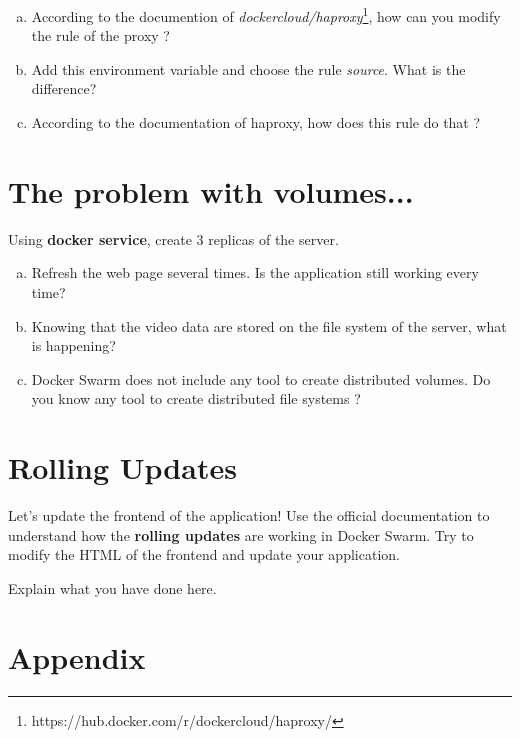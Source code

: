 \documentclass[a4paper,11pt]{exam}
\begin{document}
\begin{questions}
	\question
	\begin{enumerate}[(a)]
		\item According to the documention of \textit{dockercloud/haproxy}\footnote{https://hub.docker.com/r/dockercloud/haproxy/}, how can you modify the rule of the proxy ?
		\item Add this environment variable and choose the rule \textit{source}. What is the difference?
		\item According to the documentation of haproxy, how does this rule do that ?
	\end{enumerate}
\end{questions}


\section{The problem with volumes...}

\begin{questions}
	\question Using \textbf{docker service}, create 3 replicas of the server.
	\begin{enumerate}[(a)]
		\item Refresh the web page several times. Is the application still working every time?
		\item Knowing that the video data are stored on the file system of the server, what is happening?
		\item Docker Swarm does not include any tool to create distributed volumes. Do you know any tool to create distributed file systems ?
	\end{enumerate}
\end{questions}

\section{Rolling Updates}

Let's update the frontend of the application! Use the official documentation to understand how the \textbf{rolling updates} are working in Docker Swarm. Try to modify the HTML of the frontend and update your application.
\begin{questions}
	\question Explain what you have done here.
\end{questions}

\section{Appendix}
\end{document}
